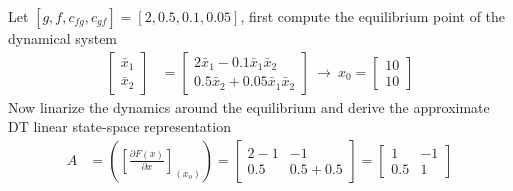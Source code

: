 \documentclass[twoside]{article}
\begin{document}
Let $[g , f , c_{fg} , c_{gf}] = [2 , 0.5 , 0.1 , 0.05]$, first compute the
equilibrium point of the dynamical system
%
\begin{align*}
	\left[ \begin{array}{c} \bar{x}_{1} \\ \bar{x}_{2} \end{array} \right]  &=
\left[ \begin{array}{c} 2 \bar{x}_1 - 0.1 \bar{x}_1 \bar{x}_2   \\ 
 0.5 \bar{x}_2 + 0.05 \bar{x}_1 \bar{x}_2  \end{array} \right] \
  \rightarrow \ x_0 = \left[ \begin{array}{c} 10 \\ 10 \end{array} \right] 
\end{align*}
%
Now linarize the dynamics around the equilibrium and derive the
approximate DT linear state-space representation
%
\begin{align*}
A &= \left( \left[ \frac{\partial F(x)}{\partial x}
                      \right]_{(x_o)} \right) =
    \left[ \begin{array}{cc} 2 - 1 & 
             - 1 \\ 
                          0.5 
           & 
             0.5 + 0.5
\end{array} \right]  =
                    \left[ \begin{array}{cc} 1 & -1 \\ 0.5 & 1 \end{array}  \right]
\end{align*}

\newpage
\end{document}
